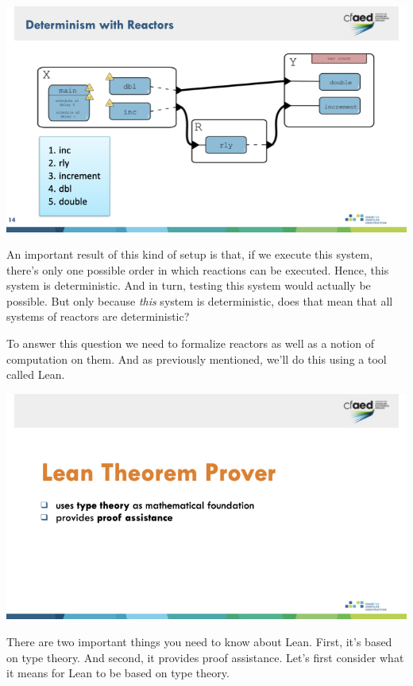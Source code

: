 \documentclass{article}
\begin{document}
\begin{center}
    \includegraphics[width=\columnwidth]{Slides/Slide 14.jpeg}
\end{center}

An important result of this kind of setup is that, if we execute this system, there's only one possible order in which reactions can be executed.
Hence, this system is deterministic.
And in turn, testing this system would actually be possible.
But only because \emph{this} system is deterministic, does that mean that all systems of reactors are deterministic?

To answer this question we need to formalize reactors as well as a notion of computation on them.
And as previously mentioned, we'll do this using a tool called Lean.

\begin{center}
    \includegraphics[width=\columnwidth]{Slides/Slide 15.jpeg}
\end{center}

There are two important things you need to know about Lean.
First, it's based on type theory. 
And second, it provides proof assistance.
Let's first consider what it means for Lean to be based on type theory.
\end{document}
